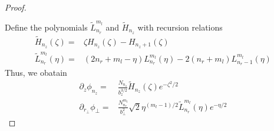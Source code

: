 \begin{proof}
\begin{align}
\begin{aligned}
  \end{aligned}
\end{align}
Define the polynomials $\tilde{L}_{n_r}^{m_l}$ and $\tilde{H}_{n_z}$ with recursion relations
\begin{align}
  \tilde{H}_{n_z}(\zeta) =& \zeta H_{n_z}(\zeta) - H_{n_z+1}(\zeta) \label{oc_Hermite_recur} \\ 
  \tilde{L}_{n_r}^{m_l}(\eta) =& (2n_r + m_l - \eta) L_{n_r}^{m_l}(\eta) - 2( n_r + m_l ) L_{n_r - 1}^{m_l}(\eta) \label{oc_L_first_der}
\end{align}
Thus, we obatain
\begin{align}
  \partial_{z}\phi_{n_z} =& \frac{N_{n_z}}{b_z^{3/2}} \tilde{H}_{n_z}(\zeta)e^{-\zeta^2/2}\\
  \partial_{r_\perp}\phi_{\perp} =& \frac{N_{n_r}^{m_l}}{b_{\perp}^{2}}\sqrt{2} \eta^{(m_l - 1)/2} \tilde{L}_{n_r}^{m_l}(\eta) e^{-\eta/2}  \label{oc_phi_perp_one_firs_der}
\end{align}


\end{proof}
